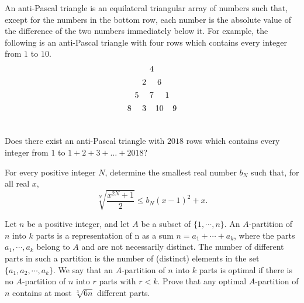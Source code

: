 \documentclass[11pt]{scrartcl}
\begin{document}
\begin{problem}[7494618588207758150]
	An anti-Pascal triangle is an equilateral triangular array of numbers such that, except for the numbers in the bottom row, each number is the absolute value of the difference of the two numbers immediately below it. For example, the following is an anti-Pascal triangle with four rows which contains every integer from $1$ to $10$.
\[\begin{array}{
c@{\hspace{4pt}}c@{\hspace{4pt}}
c@{\hspace{4pt}}c@{\hspace{2pt}}c@{\hspace{2pt}}c@{\hspace{4pt}}c
} \vspace{4pt}
 & & & 4 & & &  \\\vspace{4pt}
 & & 2 & & 6 & &  \\\vspace{4pt}
 & 5 & & 7 & & 1 & \\\vspace{4pt}
 8 & & 3 & & 10 & & 9 \\\vspace{4pt}
\end{array}\]Does there exist an anti-Pascal triangle with $2018$ rows which contains every integer from $1$ to $1 + 2 + 3 + \dots + 2018$?

\end{problem}
\begin{problem}[7500559455615129254]
For every positive integer $N$, determine the smallest real number $b_{N}$ such that, for all real $x$,
\[
\sqrt[N]{\frac{x^{2 N}+1}{2}} \leqslant b_{N}(x-1)^{2}+x .
\]
\end{problem}
\begin{problem}[7503515175847762748]
Let $n$ be a positive integer, and let $A$ be a subset of $\{ 1,\cdots ,n\}$. An $A$-partition of $n$ into $k$ parts is a representation of n as a sum $n = a_1 + \cdots + a_k$, where the parts $a_1 , \cdots , a_k $ belong to $A$ and are not necessarily distinct. The number of different parts in such a partition is the number of (distinct) elements in the set $\{ a_1 , a_2 , \cdots , a_k \} $.
We say that an $A$-partition of $n$ into $k$ parts is optimal if there is no $A$-partition of $n$ into $r$ parts with $r<k$. Prove that any optimal $A$-partition of $n$ contains at most $\sqrt[3]{6n}$ different parts.
\end{problem}
\end{document}
